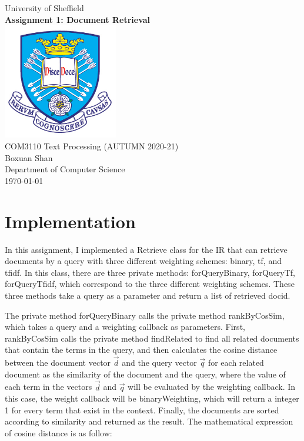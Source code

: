 \documentclass[11pt,a4paper]{article}
\begin{document}
\begin{titlepage}


\begin{center}
{\LARGE University of Sheffield}\\[1.5cm]
\linespread{1.2}\huge {\bfseries Assignment 1: Document Retrieval}\\[1.5cm]
\linespread{1}
\includegraphics[width=5cm]{images/tuoslogo.png}\\[1cm]
{\large COM3110 Text Processing (AUTUMN 2020-21)}\\[1cm]
{\Large Boxuan Shan}\\[6cm]
\large Department of Computer Science\\[1cm]
\today
\end{center}

\end{titlepage}


\newpage
\section*{\Large Implementation}

In this assignment, I implemented a Retrieve class for the IR that can retrieve documents by a query with three different weighting schemes: binary, tf, and tfidf. In this class, there are three private methods: forQueryBinary, forQueryTf, forQueryTfidf, which correspond to the three different weighting schemes. These three methods take a query as a parameter and return a list of retrieved docid. 

The private method forQueryBinary calls the private method rankByCosSim, which takes a query and a weighting callback as parameters. First, rankByCosSim calls the private method findRelated to find all related documents that contain the terms in the query, and then calculates the cosine distance between the document vector $\vec{d}$ and the query vector $\vec{q}$ for each related document as the similarity of the document and the query, where the value of each term in the vectors $\vec{d}$ and $\vec{q}$ will be evaluated by the weighting callback. In this case, the weight callback will be binaryWeighting, which will return a integer 1 for every term that exist in the context. Finally, the documents are sorted according to similarity and returned as the result. The mathematical expression of cosine distance is as follow:
\end{document}
